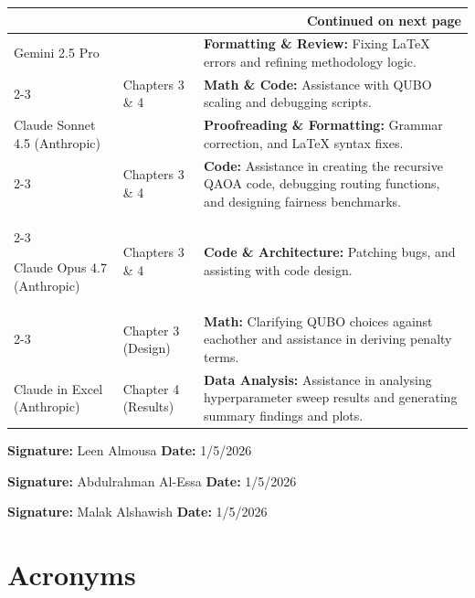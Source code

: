 \documentclass[a4paper]{report}
\begin{document}
{\begin{itemize}
\begin{longtable}{|p{3cm}|p{4.5cm}|p{6.5cm}|}
\hline \multicolumn{3}{|r|}{{Continued on next page}} \\ \hline
\endfoot

\hline
\endlastfoot

Gemini 2.5 Pro &  & \textbf{Formatting \& Review:} Fixing \LaTeX{} errors and refining methodology logic. \\
\cline{2-3}
 & Chapters 3 \& 4 & \textbf{Math \& Code:} Assistance with QUBO scaling and debugging scripts. \\
\hline
Claude Sonnet 4.5 \newline (Anthropic) && \textbf{Proofreading \& Formatting:} Grammar correction, and \LaTeX{} syntax fixes. \\
\cline{2-3}
 & Chapters 3 \& 4 & \textbf{Code:} Assistance in creating the recursive QAOA code, debugging routing functions, and designing fairness benchmarks. \\
\cline{2-3}
 
\hline
Claude Opus 4.7 \newline (Anthropic) & Chapters 3 \& 4 & \textbf{Code \& Architecture:} Patching bugs, and assisting with code design. \\
\cline{2-3}
 & Chapter 3 (Design) & \textbf{ Math:} Clarifying QUBO choices against eachother and assistance in deriving penalty terms. \\
\hline
Claude in Excel \newline (Anthropic) & Chapter 4 (Results) & \textbf{Data Analysis:} Assistance in analysing hyperparameter sweep results and generating summary findings and plots. \\
\end{longtable}
\vspace{1.5em}
\textbf{Signature:} Leen Almousa \hfill \textbf{Date:} 1/5/2026

\vspace{1.5em}
\noindent
\textbf{Signature:} Abdulrahman Al-Essa \hfill \textbf{Date:} 1/5/2026

\vspace{1.5em}
\noindent
\textbf{Signature:} Malak Alshawish \hfill \textbf{Date:} 1/5/2026
\chapter*{Acronyms}

\begin{acronym}


\end{acronym}
\end{itemize}}
\end{document}
